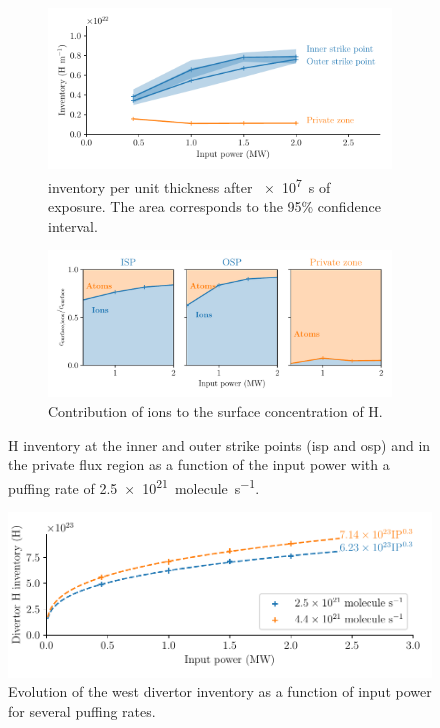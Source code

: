 \begin{figure}[h]
    \centering
    \begin{subfigure}{\linewidth}
        \includegraphics[width=\linewidth]{Figures/Chapter4/WEST/inventory_at_sps_and_private_zone_vs_input_power.pdf}
        \caption{\Gls{inventory} per unit thickness after \SI{e7}{s} of exposure. The area corresponds to the 95\% confidence interval.}
    \end{subfigure}
    \begin{subfigure}{\linewidth}                          
        \includegraphics[width=\linewidth]{Figures/Chapter4/WEST/ions_ratio_vs_input_power.pdf}
        \caption{Contribution of ions to the surface concentration of H.}
    \end{subfigure}%
    \caption{H \gls{inventory} at the inner and outer \glspl{strike point} (\gls{isp} and \gls{osp}) and in the \gls{private flux region} as a function of the input power with a puffing rate of \SI{2.5e21}{molecule.s^{-1}}.}
\end{figure}

\begin{figure}
    \centering
    \includegraphics[width=\linewidth]{Figures/Chapter4/WEST/inventory_vs_input_power.pdf}
    \caption{Evolution of the \gls{west} \gls{divertor} \gls{inventory} as a function of input power for several puffing rates.}
\end{figure}

